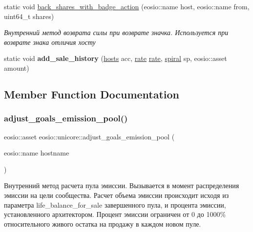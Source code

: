 \begin{DoxyCompactItemize}
static void \mbox{\hyperlink{classeosio_1_1unicore_a01a9d82308c52ec8c93653d310751d2b}{back\+\_\+shares\+\_\+with\+\_\+badge\+\_\+action}} (eosio\+::name host, eosio\+::name from, uint64\+\_\+t shares)
\begin{DoxyCompactList}\small\item\em Внутренний метод возврата силы при возврате значка. Используется при возврате знака отличия хосту \end{DoxyCompactList}\item 
\mbox{\label{classeosio_1_1unicore_a9121ac21b1820a4936343c03f1d1a6fe}} 
static void {\bfseries add\+\_\+sale\+\_\+history} (\mbox{\hyperlink{structhosts}{hosts}} acc, \mbox{\hyperlink{structrate}{rate}} \mbox{\hyperlink{structrate}{rate}}, \mbox{\hyperlink{structspiral}{spiral}} sp, eosio\+::asset amount)
\end{DoxyCompactItemize}


\subsection{Member Function Documentation}
\mbox{\label{classeosio_1_1unicore_acd0fd09c0cbd6459684222639c98d628}} 
\subsubsection{\texorpdfstring{adjust\+\_\+goals\+\_\+emission\+\_\+pool()}{adjust\_goals\_emission\_pool()}}
{\footnotesize\ttfamily eosio\+::asset eosio\+::unicore\+::adjust\+\_\+goals\+\_\+emission\+\_\+pool (\begin{DoxyParamCaption}\item[{eosio\+::name}]{hostname }\end{DoxyParamCaption})\hspace{0.3cm}{\ttfamily [static]}}



Внутренний метод расчета пула эмиссии. Вызывается в момент распределения эмиссии на цели сообщества. Расчет объема эмиссии происходит исходя из параметра life\+\_\+balance\+\_\+for\+\_\+sale завершенного пула, и процента эмиссии, установленного архитектором. Процент эмиссии ограничен от 0 до 1000\% относительного живого остатка на продажу в каждом новом пуле. 


